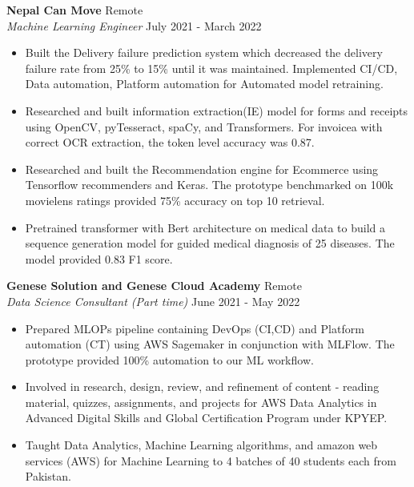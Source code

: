 \documentclass[a4paper]{article}
\begin{document}
\textbf{Nepal Can Move} \hfill Remote\\
\textit{Machine Learning Engineer} \hfill July 2021 - March 2022\\
\vspace{-1mm}
\begin{itemize} \itemsep 0pt
	\item Built the Delivery failure prediction system which decreased the delivery failure rate from 25\% to 15\% until it was maintained. Implemented CI/CD, Data automation, Platform automation for Automated model retraining.
	\item Researched and built information extraction(IE) model for forms and receipts using OpenCV, pyTesseract, spaCy, and Transformers. For invoicea with correct OCR extraction, the token level accuracy was 0.87.
	\item Researched and built the Recommendation engine for Ecommerce using Tensorflow recommenders and Keras. The prototype benchmarked on 100k movielens ratings provided 75\% accuracy on top 10 retrieval.
	\item Pretrained transformer with Bert architecture on medical data to build a sequence generation model for guided medical diagnosis of 25 diseases. The model provided 0.83 F1 score.
\end{itemize}

\textbf{Genese Solution and Genese Cloud Academy} \hfill Remote\\
\textit{Data Science Consultant (Part time)} \hfill June 2021 - May 2022\\
\vspace{-1mm}
\begin{itemize} \itemsep 0pt
	\item Prepared MLOPs pipeline containing DevOps (CI,CD) and Platform automation (CT) using AWS Sagemaker in conjunction with MLFlow. The prototype provided 100\% automation to our ML workflow.
	\item Involved in research, design, review, and refinement of content - reading material, quizzes, assignments, and projects for AWS Data Analytics in Advanced Digital Skills and Global Certification Program under KPYEP.
	\item Taught Data Analytics, Machine Learning algorithms, and amazon web services (AWS) for Machine Learning to 4 batches of 40 students each from Pakistan.
\end{itemize}
\end{document}
